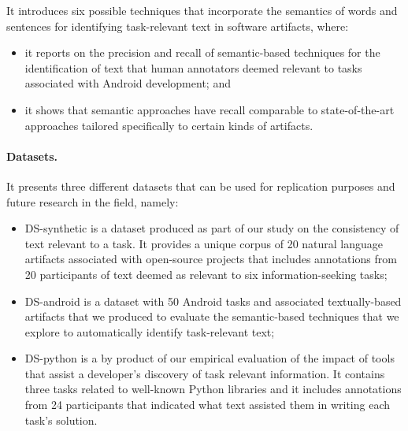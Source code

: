 It introduces six possible techniques that incorporate the semantics of words and sentences for identifying task-relevant text in software artifacts, where:
    
\begin{itemize}
    
    \item it reports on the precision and recall of semantic-based techniques for the identification of text that human annotators deemed relevant to tasks associated with Android development; and
    \item it shows that semantic approaches have recall comparable to state-of-the-art approaches
    tailored specifically to certain kinds of artifacts.
\end{itemize}


\paragraph{\textbf{Datasets.}} 

It presents three different datasets that can be used for replication purposes and future research in the field, namely:
    
\begin{itemize}
    \item \acs{DS-synthetic} is a dataset produced as part of our study on the consistency of text relevant to a task.
    It provides a unique corpus of 20 natural language artifacts associated
    with open-source projects that includes annotations from 20 participants of text deemed as relevant to six information-seeking tasks;
    
    \item \acs{DS-android} is a dataset with 50 Android tasks and associated textually-based artifacts 
    that we produced to evaluate the semantic-based techniques that we explore to automatically identify task-relevant text;

    \item \acs{DS-python} is a by product of our empirical evaluation of the impact of tools that assist a developer's discovery of task relevant information.
    It contains three tasks related to well-known Python libraries and it includes annotations from 24 participants that indicated what text assisted them in writing each task's solution.
\end{itemize}